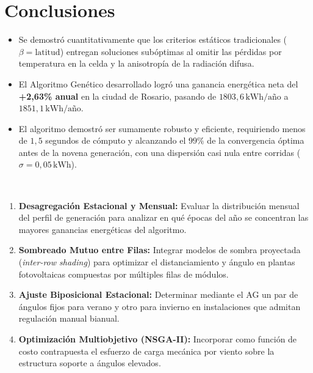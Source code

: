 \documentclass[12pt, a4paper, twocolumn]{article}
\begin{document}
\section{Conclusiones}
\begin{itemize}
    \item Se demostró cuantitativamente que los criterios estáticos tradicionales ($\beta = \text{latitud}$) entregan soluciones subóptimas al omitir las pérdidas por temperatura en la celda y la anisotropía de la radiación difusa.
    \item El Algoritmo Genético desarrollado logró una ganancia energética neta del \textbf{+2,63\% anual} en la ciudad de Rosario, pasando de $1803,6\,\text{kWh/año}$ a $1851,1\,\text{kWh/año}$.
    \item El algoritmo demostró ser sumamente robusto y eficiente, requiriendo menos de $1,5$ segundos de cómputo y alcanzando el $99\%$ de la convergencia óptima antes de la novena generación, con una dispersión casi nula entre corridas ($\sigma = 0,05\,\text{kWh}$).
\end{itemize}

\vspace{0.4cm}


 \\
{\fontsize{10}{12}\selectfont
\begin{enumerate}
    \item \textbf{Desagregación Estacional y Mensual:} Evaluar la distribución mensual del perfil de generación para analizar en qué épocas del año se concentran las mayores ganancias energéticas del algoritmo.
    \item \textbf{Sombreado Mutuo entre Filas:} Integrar modelos de sombra proyectada (\textit{inter-row shading}) para optimizar el distanciamiento y ángulo en plantas fotovoltaicas compuestas por múltiples filas de módulos.
    \item \textbf{Ajuste Biposicional Estacional:} Determinar mediante el AG un par de ángulos fijos para verano y otro para invierno en instalaciones que admitan regulación manual bianual.
    \item \textbf{Optimización Multiobjetivo (NSGA-II):} Incorporar como función de costo contrapuesta el esfuerzo de carga mecánica por viento sobre la estructura soporte a ángulos elevados.
\end{enumerate}
\par}
\end{document}
